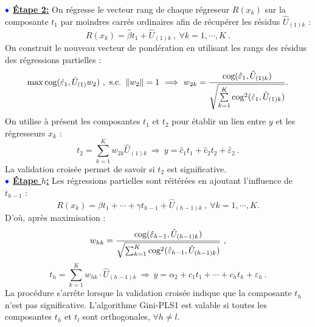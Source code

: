 $\bulle$ \underline{\textbf{Étape 2:}} On régresse le vecteur rang de chaque régreseur $R(x_k)$ sur la composante $t_1$ par moindres carrés ordinaires afin de récupérer les résidus $\hat{U}_{(1)k}$ : 
\[
R(x_k) = \hat{\beta}t_1 + \hat{U}_{(1)k} \ , \ \forall k = 1,\cdots, K \ .
\]
On construit le nouveau vecteur de pondération en utilisant les rangs des résidus des régressions partielles :
\[
\mathop{\mathrm{max}}\limits \text{cog}(\hat{\varepsilon}_1,\hat{U}_{(1)} w_2) \ , \ \text{s.c.} \ \left\|w_2\right\|=1 \ \Longrightarrow \ w_{2k} = \frac{\text{cog}(\hat{\varepsilon}_1,\hat{U}_{(1)k})}{\sqrt{\sum\limits_{k=1}^K \text{cog}^2(\hat{\varepsilon}_1,\hat{U}_{(1)k})}} .
\]
On utilise à présent les composantes $t_1$ et $t_2$ pour établir un lien entre $y$ et les régresseurs $x_k$ :
\[
t_2 = \sum\limits^K_{k=1} w_{2k} \hat{U}_{(1)k} \ \Longrightarrow \ y = \hat{c}_1 t_1 + \hat{c}_2 t_2 + \hat{\varepsilon}_2 \ .
\]
La validation croisée permet de savoir si $t_2$ est significative.\\

$\bulle$ \underline{\textbf{Étape $h$:}} Les régressions partielles sont réitérées en ajoutant l'influence de $t_{h-1}$ :
\[
R(x_k) = \beta t_1 + \cdots + \gamma t_{h-1} + \hat{U}_{(h-1)k} \ , \ \forall k = 1,\cdots, K.
\]
D'où, après maximisation :
\[
w_{hk} = \frac{\text{cog}(\hat{\varepsilon}_{h-1},\hat{U}_{(h-1)k})}{\sqrt{\sum_{k=1}^K \text{cog}^2(\hat{\varepsilon}_{h-1},\hat{U}_{(h-1)k})}} \ ,
\]
\[
t_h = \sum_{k=1}^K w_{hk}\cdot \hat{U}_{(h-1)k} \ \Longrightarrow \ y = \alpha_2 + c_1 t_1 + \cdots + c_h t_h + \varepsilon_h \ .
\]
La procédure s'arrête lorsque la validation croisée indique que la composante $t_h$ n'est pas significative. L'algorithme Gini-PLS1 est valable si toutes les composantes $t_h$ et $t_l$ sont orthogonales, $\forall h\neq l$. 

\medskip


